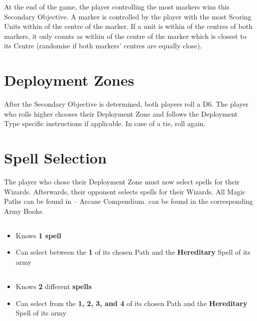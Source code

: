 At the end of the game, the player controlling the most markers wins this Secondary Objective. A marker is controlled by the player with the most Scoring Units within  of the centre of the marker. If a unit is within  of the centres of both markers, it only counts as within  of the centre of the marker which is closest to its Centre (randomise if both markers' centres are equally close).

\columnbreak

\section{Deployment Zones}
\label{deployment_zones}

After the Secondary Objective is determined, both players roll a D6. The player who rolls higher chooses their Deployment Zone and follows the Deployment Type specific instructions if applicable. In case of a tie, roll again.

\section{Spell Selection}
\label{spell_selection}

The player who chose their Deployment Zone must now select spells for their Wizards. Afterwards, their opponent selects spells for their Wizards. All Magic Paths can be found in \nameofthegame{} -- Arcane Compendium. \hereditaryspells{} can be found in the corresponding Army Books.

\subsection{\wizardapprentice}

\begin{itemize}
\item Knows \textbf{1 spell}
\item Can select between the \learnedspell{} \textbf{1} of its chosen Path and the \textbf{Hereditary} Spell of its army
\end{itemize}

\subsection{\wizardadept}

\begin{itemize}
\item Knows \textbf{2} different \textbf{spells}
\item Can select from the \learnedspells{} \textbf{1, 2, 3, and 4} of its chosen Path and the \textbf{Hereditary} Spell of its army
\end{itemize}

